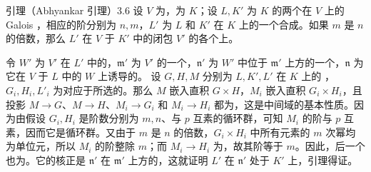 \begin{SGAresult}{引理（Abhyankar 引理）}{3.6}
设 $V$ 为，为 $K$；设 $L,K'$ 为 $K$ 的两个在 $V$ 上的 Galois ，相应的阶分别为 $n,m$，$L'$ 为 $L$ 和 $K'$ 在 $K$ 上的一个合成。如果 $m$ 是 $n$ 的倍数，那么 $L'$ 在 $V$ 于 $K'$ 中的闭包 $V'$ 的各个上。
\end{SGAresult}
令 $W'$ 为 $V'$ 在 $L'$ 中的，$\mathfrak m'$ 为 $V'$ 的一个，$\mathfrak n'$ 为 $W'$ 中位于 $\mathfrak m'$ 上方的一个，$\mathfrak n$ 为它在 $V$ 于 $L$ 中的 $W$ 上诱导的。
设 $G,H,M$ 分别为 $L,K',L'$ 在 $K$ 上的 ，$G_i,H_i,L'_i$ 为对应于所选的。那么 $M$ 嵌入直积 $G\times H$，$M_i$ 嵌入直积 $G_i\times H_i$，且投影 $M\to G$、$M\to H$、$M_i\to G_i$ 和 $M_i\to H_i$ 都为，这是中间域的基本性质。因为由假设 $G_i,H_i$ 是阶数分别为 $m,n$、与 $p$ 互素的循环群，可知 $M_i$ 的阶与 $p$ 互素，因而它是循环群。又由于 $m$ 是 $n$ 的倍数，$G_i\times H_i$ 中所有元素的 $m$ 次幂均为单位元，所以 $M_i$ 的阶整除 $m$；而 $M_i\to H_i$ 为，故其阶等于 $m$。因此，后一个也为。它的核正是 $\mathfrak n'$ 在 $\mathfrak m'$ 上方的，这就证明 $L'$ 在 $\mathfrak n'$ 处于 $K'$ 上，引理得证。

